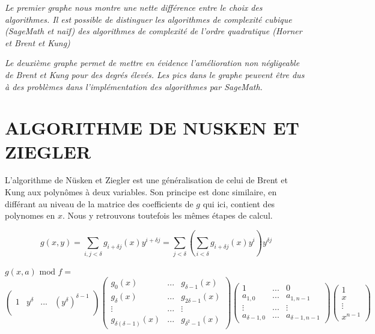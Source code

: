 \documentclass[a4paper]{article}
\begin{document}
\begin{multicols}{2}
    \textit{Le premier graphe nous montre une nette différence entre le choix des algorithmes. 
    Il est possible de distinguer les algorithmes de complexité cubique (SageMath et naïf) des algorithmes de complexité de l'ordre quadratique (Horner et Brent et Kung)}
    \columnbreak

    \textit{Le deuxième graphe permet de mettre en évidence l'amélioration non négligeable de Brent et Kung pour des degrés élevés.
    Les pics dans le graphe peuvent être dus à des problèmes dans l'implémentation des algorithmes par SageMath.}
\end{multicols}

\newpage

\section{ALGORITHME DE NUSKEN ET ZIEGLER}

L'algorithme de Nüsken et Ziegler est une généralisation de celui de Brent et Kung aux polynômes à deux variables. 
Son principe est donc similaire, en différant au niveau de la matrice des coefficients de $g$ qui ici, contient des polynomes en $x$.
Nous y retrouvons toutefois les mêmes étapes de calcul.
\cite{NuskenZiegler2004}

\[
g(x,y) = \sum_{i,j<\delta}g_{i+\delta j}(x)y^{i+\delta j} = \sum_{j<\delta} \left( \sum_{i<\delta} g_{i+\delta j}(x)y^i \right) y^{\delta j}     
\]

$g(x, a)\text{ mod }f =$
\[
\begin{pmatrix}
    1 & y^\delta & ... & (y^\delta)^{\delta-1}  \\  
\end{pmatrix}
\begin{pmatrix}
    g_0(x) & ... & g_{\delta-1}(x) \\
    g_{\delta}(x) & ... & g_{2\delta-1}(x) \\
    \vdots & ... & \vdots \\
    g_{\delta(\delta-1)}(x) & ... & g_{\delta^2-1}(x)
\end{pmatrix}
\begin{pmatrix}
    1 &  ... & 0 \\
    a_{1,0} & ... & a_{1,n-1} \\
    \vdots &  ... & \vdots \\
    a_{\delta-1,0} & ... & a_{\delta-1,n-1}
\end{pmatrix}
\begin{pmatrix}
    1 \\
    x \\
    \vdots \\
    x^{n-1}
\end{pmatrix}
\]
\end{document}
